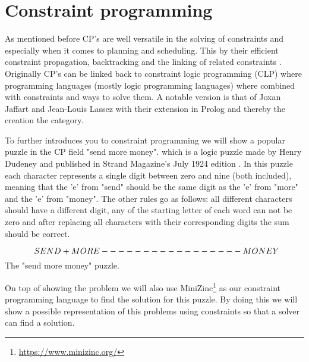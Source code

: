 \section{Constraint programming}
\label{CS:CP}
As mentioned before CP's are well versatile in the solving of constraints and especially when it comes to planning and scheduling. This by their efficient constraint propagation, backtracking and the linking of related constraints \cite{66WikiCP}. Originally CP's can be linked back to constraint logic programming (CLP) where programming languages (mostly logic programming languages) where combined with constraints and ways to solve them. A notable version is that of Joxan Jaffart and Jean-Louis Lassez \cite{65jaffar1987constraint, 66WikiCP} with their extension in Prolog and thereby the creation the category.

To further introduces you to constraint programming we will show a popular puzzle in the CP field "send more money". which is a logic puzzle made by Henry Dudeney and published in Strand Magazine's July 1924 edition \cite{sendMoreMoney}.
In this puzzle each character represents a single digit between zero and nine (both included), meaning that the 'e' from "send" should be the same digit as the 'e' from "more" and the 'e' from "money". The other rules go as follows: all different characters should have a different digit, any of the starting letter of each word can not be zero and after replacing all characters with their corresponding digits the sum should be correct. 
\begin{center}
	\[$$
	\; \; S E N D\\
	+ M O R E\\
	-----------------\\
	M O N E Y
	$$\] The "send more money" puzzle.
\end{center}
On top of showing the problem we will also use MiniZinc\footnote{\url{https://www.minizinc.org/}} as our constraint programming language to find the solution for this puzzle. By doing this we will show a possible representation of this problems using constraints so that a solver can find a solution.


